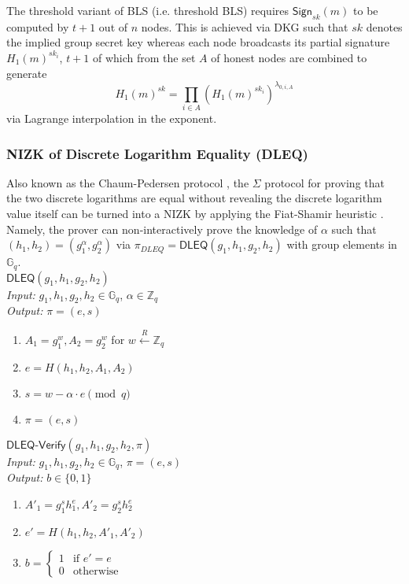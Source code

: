 \documentclass[conference]{IEEEtran}
\theoremstyle{definition}
\theoremstyle{remark}
\begin{document}
The threshold variant \cite{boldyreva2003threshold} of BLS (i.e. threshold BLS) requires $\mathsf{Sign}_{sk}(m)$ to be computed by $t + 1$ out of $n$ nodes. This is achieved via DKG such that $sk$ denotes the implied group secret key whereas each node broadcasts its partial signature $H_1(m)^{sk_i}$, $t + 1$ of which from the set $A$ of honest nodes are combined to generate
\[
H_1(m)^{sk} = \prod_{i \in A} \left(H_1(m)^{sk_i}\right)^{\lambda_{0, i, A}}
\]
via Lagrange interpolation in the exponent.

\subsubsection{NIZK of Discrete Logarithm Equality (DLEQ)}
\label{appendix:dleq}
Also known as the Chaum-Pedersen protocol \cite{chaum1992wallet}, the $\Sigma$ protocol \cite{damgaard2002sigma} for proving that the two discrete logarithms are equal without revealing the discrete logarithm value itself can be turned into a NIZK by applying the Fiat-Shamir heuristic \cite{fiat1986prove}. Namely, the prover can non-interactively prove the knowledge of $\alpha$ such that $(h_1, h_2) = (g_1^\alpha, g_2^\alpha)$ via $\pi_{DLEQ} = \mathsf{DLEQ}(g_1, h_1, g_2, h_2)$ with group elements in $\mathbb{G}_q$.\\

\noindent\underline{$\mathsf{DLEQ}(g_1, h_1, g_2, h_2)$}\\
\textit{Input:} $g_1, h_1, g_2, h_2 \in \mathbb{G}_q$, $\alpha \in \mathbb{Z}_q$\\
\textit{Output:} $\pi = (e, s)$
\vspace{-\topsep}
\begin{enumerate}
\item $A_1 = g_1^w, A_2 = g_2^w$ for $w \xleftarrow{R} \mathbb{Z}_q$
\item $e = H(h_1, h_2, A_1, A_2)$
\item $s = w - \alpha \cdot e \pmod q$
\item $\pi = (e, s)$
\end{enumerate}

\noindent\underline{$\mathsf{DLEQ}\text{-}\mathsf{Verify}(g_1, h_1, g_2, h_2, \pi)$}\\
\textit{Input:} $g_1, h_1, g_2, h_2 \in \mathbb{G}_q$, $\pi = (e, s)$\\
\textit{Output:} $b \in \{0, 1\}$
\vspace{-\topsep}
\begin{enumerate}
\item $A'_1 = g_1^s h_1^e, A'_2 = g_2^s h_2^e$
\item $e' = H(h_1, h_2, A'_1, A'_2)$
\item $b = \begin{cases}
1 & \text{if $e' = e$}\\
0 & \text{otherwise}
\end{cases}$
\end{enumerate}
\end{document}
